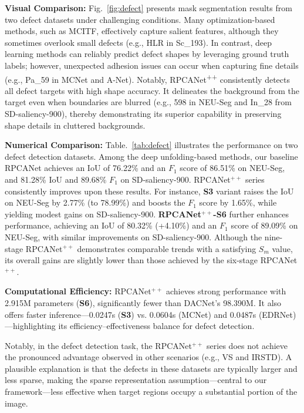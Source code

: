 \documentclass[10pt,journal,compsoc]{IEEEtran}
\begin{document}
\noindent \textbf{Visual Comparison:}  Fig.~\ref{fig:defect} presents mask segmentation results from two defect datasets under challenging conditions. Many optimization-based methods, such as MCITF, effectively capture salient features, although they sometimes overlook small defects (e.g., HLR in Sc\_193). In contrast, deep learning methods can reliably predict defect shapes by leveraging ground truth labels; however, unexpected adhesion issues can occur when capturing fine details (e.g., Pa\_59 in MCNet and A-Net). Notably, RPCANet\textsuperscript{++} consistently detects all defect targets with high shape accuracy. It delineates the background from the target even when boundaries are blurred (e.g., 598 in NEU-Seg and In\_28 from SD-saliency-900), thereby demonstrating its superior capability in preserving shape details in cluttered backgrounds.

\noindent \textbf{Numerical Comparison:}  
Table.~\ref{tab:defect} illustrates the performance on two defect detection datasets. Among the deep unfolding-based methods, our baseline RPCANet achieves an IoU of 76.22\% and an $F_1$ score of 86.51\% on NEU-Seg, and 81.28\% IoU and 89.68\% $F_1$ on SD-saliency-900. RPCANet$^{++}$ series consistently improves upon these results. For instance, \textbf{S3} variant raises the IoU on NEU-Seg by 2.77\% (to 78.99\%) and boosts the $F_1$ score by 1.65\%, while yielding modest gains on SD-saliency-900. \textbf{RPCANet$^{++}$-S6} further enhances performance, achieving an IoU of 80.32\% (+4.10\%) and an $F_1$ score of 89.09\% on NEU-Seg, with similar improvements on SD-saliency-900. Although the nine-stage RPCANet$^{++}$ demonstrates comparable trends with a satisfying $S_m$ value, its overall gains are slightly lower than those achieved by the six-stage RPCANet$^{++}$. 


\noindent\textbf{Computational Efficiency:} RPCANet$^{++}$ achieves strong performance with 2.915M parameters (\textbf{S6}), significantly fewer than DACNet’s 98.390M. It also offers faster inference—0.0247s (\textbf{S3}) vs. 0.0604s (MCNet) and 0.0487s (EDRNet)—highlighting its efficiency–effectiveness balance for defect detection.

Notably, in the defect detection task, the RPCANet$^{++}$ series does not achieve the pronounced advantage observed in other scenarios (e.g., VS and IRSTD). A plausible explanation is that the defects in these datasets are typically larger and less sparse, making the sparse representation assumption—central to our framework—less effective when target regions occupy a substantial portion of the image.
\end{document}
